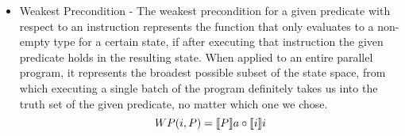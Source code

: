 \begin{itemize}
    \item Weakest Precondition - The weakest precondition for a given predicate with respect to an instruction represents the function that only evaluates to a non-empty type for a certain state, if after executing that instruction the given predicate holds in the resulting state.
    When applied to an entire parallel program, it represents the broadest possible subset of the state space, from which executing a single batch of the program definitely takes us into the truth set of the given predicate, no matter which one we chose.
    \begin{equation}
        WP(i , P) = \llbracket P \rrbracket a \circ \llbracket i \rrbracket i
    \end{equation}
    \begin{code}
        \>[2]\AgdaSpace{}%
        \AgdaSymbol{:}\AgdaSpace{}%
        \AgdaSymbol{(}\AgdaSpace{}%
        \AgdaSpace{}%
        \AgdaSymbol{)}\AgdaSpace{}%
        \AgdaSpace{}%
        \<%
        \\
        \>[2]\AgdaSpace{}%
        \AgdaSymbol{(}\AgdaSpace{}%
        \AgdaOperator{\AgdaInductiveConstructor{,}}\AgdaSpace{}%
        \AgdaSymbol{)}\AgdaSpace{}%
        \AgdaSymbol{=}\AgdaSpace{}%
        \AgdaSpace{}%
        \AgdaSpace{}%
        \AgdaSpace{}%
        \AgdaSymbol{(}\AgdaSpace{}%
        \AgdaSpace{}%
        \AgdaSpace{}%
        \AgdaSymbol{)}\AgdaSpace{}%
        \AgdaSpace{}%
        \<%
        \\
        \\[\AgdaEmptyExtraSkip]%
        \>[2]\AgdaSpace{}%
        \AgdaSymbol{:}\AgdaSpace{}%
        \AgdaSymbol{(}\AgdaSpace{}%
        \AgdaSpace{}%
        \AgdaSymbol{)}\AgdaSpace{}%
        \AgdaSpace{}%
        \<%
        \\
        \>[2]\AgdaSpace{}%
        \AgdaSymbol{(}\AgdaSpace{}%
        \AgdaOperator{\AgdaInductiveConstructor{,}}\AgdaSpace{}%
        \AgdaSymbol{)}\AgdaSpace{}%

\end{code}
\end{itemize}
